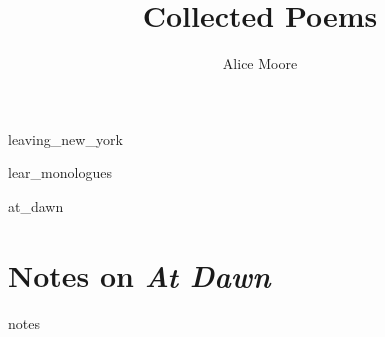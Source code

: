 \documentclass[ebook, twoside,openright, final]{memoir}
\title{Collected Poems}
\author{Alice Moore}
\date{}
\begin{document}
\setlength\epigraphwidth{5cm}
\setlength\epigraphrule{0pt}
\epigraphfontsize{\footnotesize}

\setlength\vgap{2.5em}

\PlainPoemTitle

\frontmatter
\pagestyle{empty}

\begin{titlingpage}
\maketitle
\end{titlingpage}

\let\tocheadstart\relax
\tableofcontents*

\renewcommand{\printbookname}{}
\renewcommand{\printbooknum}{}
\renewcommand{\printpartnum}{}
\renewcommand{\printpartname}{}
\renewcommand{\printchaptername}{}
\renewcommand{\printchapternum}{}

\mainmatter
\pagestyle{myheadings}

{leaving_new_york}

{lear_monologues}

{at_dawn}

\renewcommand\appendixname{Notes}

\appendix

\chapter{Notes on \textit{At Dawn}}
{notes}
\end{document}
